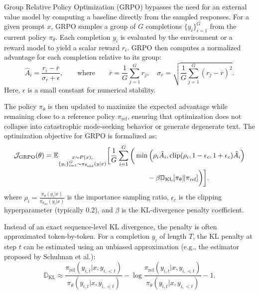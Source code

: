 \documentclass[12pt,a4paper]{report}
\begin{document}
Group Relative Policy Optimization (GRPO) bypasses the need for an external value model by computing a baseline directly from the sampled responses. For a given prompt $x$, GRPO samples a group of $G$ completions $\{y_i\}_{i=1}^{G}$ from the current policy $\pi_\theta$. Each completion $y_i$ is evaluated by the environment or a reward model to yield a scalar reward $r_i$. GRPO then computes a normalized advantage for each completion relative to its group:
\begin{equation}
  \hat{A}_i = \frac{r_i-\bar{r}}{\sigma_r+\epsilon},
  \qquad \text{where} \qquad
  \bar{r}=\frac{1}{G}\sum_{j=1}^{G}r_j,
  \quad
  \sigma_r = \sqrt{\frac{1}{G}\sum_{j=1}^{G}(r_j - \bar{r})^2}.
\end{equation}
Here, $\epsilon$ is a small constant for numerical stability.

The policy $\pi_\theta$ is then updated to maximize the expected advantage while remaining close to a reference policy $\pi_{\text{ref}}$, ensuring that optimization does not collapse into catastrophic mode-seeking behavior or generate degenerate text. The optimization objective for GRPO is formalized as:
\begin{equation}
\begin{aligned}
  \mathcal{J}_{\text{GRPO}}(\theta)
  &= \mathbb{E}_{\substack{x \sim P(x),\\ \{y_i\}_{i=1}^G \sim \pi_{\theta_{\text{old}}}(y|x)}} \bigg[
  \frac{1}{G} \sum_{i=1}^G \bigg(
  \min \left( \rho_i \hat{A}_i,
  \text{clip}(\rho_i, 1 - \epsilon_c, 1 + \epsilon_c) \hat{A}_i \right) \\
  &\hspace{5.2cm}
  - \beta \mathbb{D}_{\text{KL}}[\pi_\theta \| \pi_{\text{ref}}]
  \bigg) \bigg].
\end{aligned}
\end{equation}
where $\rho_i = \frac{\pi_\theta(y_i|x)}{\pi_{\theta_{\text{old}}}(y_i|x)}$ is the importance sampling ratio, $\epsilon_c$ is the clipping hyperparameter (typically 0.2), and $\beta$ is the KL-divergence penalty coefficient. 

Instead of an exact sequence-level KL divergence, the penalty is often approximated token-by-token. For a completion $y_i$ of length $T$, the KL penalty at step $t$ can be estimated using an unbiased approximation (e.g., the estimator proposed by Schulman et al.):
\begin{equation}
  \mathbb{D}_{\text{KL}} \approx \frac{\pi_{\text{ref}}(y_{i,t} | x, y_{i,<t})}{\pi_\theta(y_{i,t} | x, y_{i,<t})} - \log \frac{\pi_{\text{ref}}(y_{i,t} | x, y_{i,<t})}{\pi_\theta(y_{i,t} | x, y_{i,<t})} - 1.
\end{equation}
\end{document}
